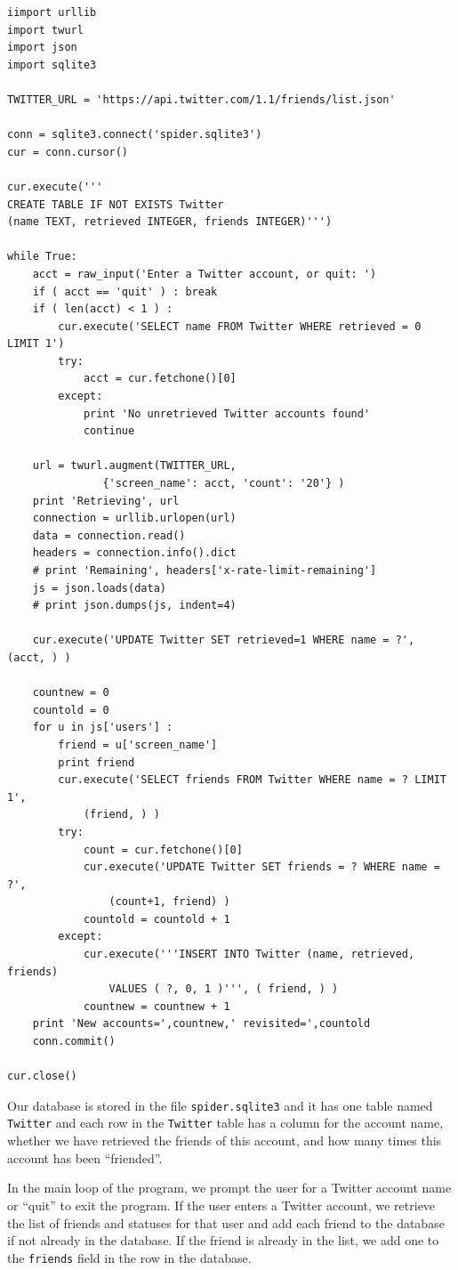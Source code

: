 \documentclass[11pt]{book}
\begin{document}
\beforeverb
\begin{verbatim}
iimport urllib
import twurl
import json
import sqlite3

TWITTER_URL = 'https://api.twitter.com/1.1/friends/list.json'

conn = sqlite3.connect('spider.sqlite3')
cur = conn.cursor()

cur.execute('''
CREATE TABLE IF NOT EXISTS Twitter 
(name TEXT, retrieved INTEGER, friends INTEGER)''')

while True:
    acct = raw_input('Enter a Twitter account, or quit: ')
    if ( acct == 'quit' ) : break
    if ( len(acct) < 1 ) :
        cur.execute('SELECT name FROM Twitter WHERE retrieved = 0 LIMIT 1')
        try:
            acct = cur.fetchone()[0]
        except:
            print 'No unretrieved Twitter accounts found'
            continue

    url = twurl.augment(TWITTER_URL, 
               {'screen_name': acct, 'count': '20'} )
    print 'Retrieving', url
    connection = urllib.urlopen(url)
    data = connection.read()
    headers = connection.info().dict
    # print 'Remaining', headers['x-rate-limit-remaining']
    js = json.loads(data)
    # print json.dumps(js, indent=4)

    cur.execute('UPDATE Twitter SET retrieved=1 WHERE name = ?', (acct, ) )

    countnew = 0
    countold = 0
    for u in js['users'] :
        friend = u['screen_name']
        print friend
        cur.execute('SELECT friends FROM Twitter WHERE name = ? LIMIT 1', 
            (friend, ) )
        try:
            count = cur.fetchone()[0]
            cur.execute('UPDATE Twitter SET friends = ? WHERE name = ?', 
                (count+1, friend) )
            countold = countold + 1
        except:
            cur.execute('''INSERT INTO Twitter (name, retrieved, friends) 
                VALUES ( ?, 0, 1 )''', ( friend, ) )
            countnew = countnew + 1
    print 'New accounts=',countnew,' revisited=',countold
    conn.commit()

cur.close()
\end{verbatim}
\afterverb
%
Our database is stored in the file {\tt spider.sqlite3} and it has one 
table named {\tt Twitter} and each row in the {\tt Twitter} table
has a column for the account name, whether we have retrieved the friends
of this account, and how many times this account has been ``friended''.

In the main loop of the program, we prompt the user for a Twitter
account name or ``quit'' to exit the program.  
If the user enters a Twitter account, we retrieve the 
list of friends and statuses
for that user and add each friend to the database if 
not already in the database.  If the friend is already in the list, 
we add one to the {\tt friends} field in the row in the database.
\end{document}
